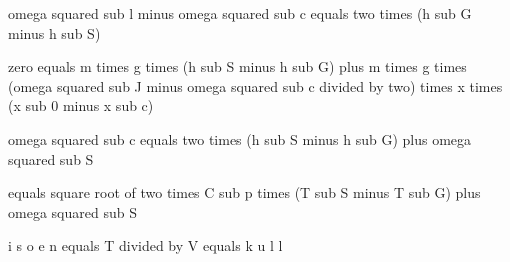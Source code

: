 omega squared sub l minus omega squared sub c equals two times (h sub G minus h sub S)

zero equals m times g times (h sub S minus h sub G) plus m times g times (omega squared sub J minus omega squared sub c divided by two) times x times (x sub 0 minus x sub c)

omega squared sub c equals two times (h sub S minus h sub G) plus omega squared sub S

equals square root of two times C sub p times (T sub S minus T sub G) plus omega squared sub S

i s o e n equals T divided by V equals k u l l